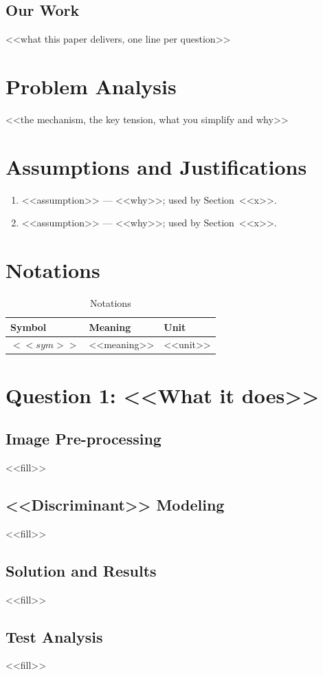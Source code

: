 \documentclass[<<options>>]{apmcmthesis}
\begin{document}
\subsection{Our Work}
<<what this paper delivers, one line per question>>
\section{Problem Analysis}
<<the mechanism, the key tension, what you simplify and why>>
\section{Assumptions and Justifications}
\begin{enumerate}
  \item <<assumption>> --- <<why>>; used by Section~<<x>>.
  \item <<assumption>> --- <<why>>; used by Section~<<x>>.
\end{enumerate}
\section{Notations}
\begin{table}[htbp]\centering\caption{Notations}\label{tab:notation}
\begin{tabular}{@{}lll@{}}\toprule Symbol & Meaning & Unit \\ \midrule
$<<sym>>$ & <<meaning>> & <<unit>> \\ \bottomrule\end{tabular}\end{table}
\section{Question 1: <<What it does>>}
\subsection{Image Pre-processing}
<<fill>>
\subsection{<<Discriminant>> Modeling}
<<fill>>
\subsection{Solution and Results}
<<fill>>
\subsection{Test Analysis}
<<fill>>
\end{document}
